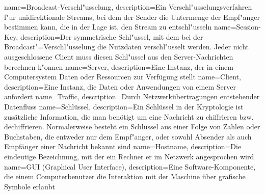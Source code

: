 {
  name=Broadcast-Verschl"usselung,
  description={Ein Verschl"usselungsverfahren f"ur unidirektionale Streams, bei dem der
  Sender die Untermenge der Empf"anger bestimmen kann, die in der Lage ist, den Stream
  zu entschl"usseln}
}
{
  name=Session-Key,
  description={Der symmetrische Schl"ussel, mit dem bei der Broadcast"=Verschl"usselung die
  Nutzdaten verschl"usselt werden. Jeder nicht ausgeschlossene Client muss diesen Schl"ussel
  aus den Server-Nachrichten berechnen k"onnen}
}
{
  name=Server,
  description={Eine Instanz, der in einem Computersystem Daten oder Ressourcen zur Verfügung stellt}
}
{
  name=Client,
  description={Eine Instanz, die Daten oder Anwendungen von einem Server anfordert}
}
{
  name=Traffic,
  description={Durch Netzwerkübertragungen entstehender Datenfluss}
}
{
  name=Schlüssel,
  description={Ein Schlüssel in der Kryptologie ist zusätzliche Information, die man benötigt um eine
	Nachricht zu chiffrieren bzw. dechiffrieren. Normalerweise besteht ein Schlüssel aus einer Folge von
	Zahlen oder Buchstaben, die entweder nur dem Empf"anger, oder sowohl Absender als auch Empfänger
        einer Nachricht bekannt sind}
}
{
  name=Hostname,
  description={Die eindeutige Bezeichnung, mit der ein Rechner er im Netzwerk angesprochen wird}
}
{
  name=GUI (Graphical User Interface),
  description={Eine Software-Komponente, die einem Computerbenutzer die Interaktion mit der Maschine
   über grafische Symbole erlaubt}
}

\renewcommand*{\glossaryname}{\section{\glossarName}}

\glsaddall
\printglossaries

